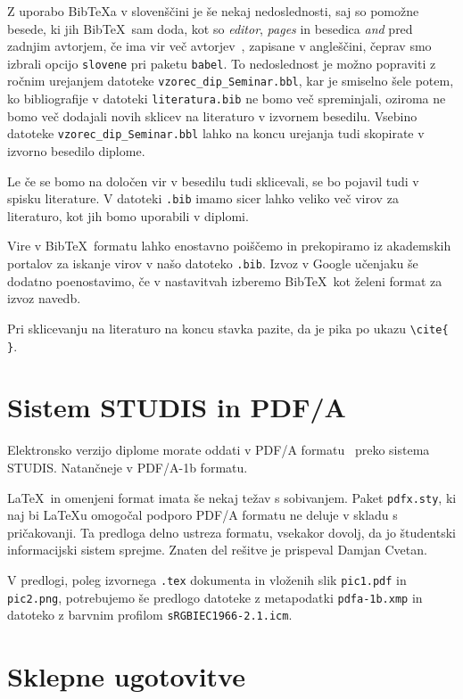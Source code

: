 \documentclass[a4paper, 12pt]{book}
\newcommand{\BibTeX}{{\sc Bib}\TeX}
\begin{document}
Z uporabo \BibTeX{a} v slovenščini je še nekaj nedoslednosti, saj so pomožne besede, ki jih \BibTeX\ sam doda,  kot so \textit{editor},  \textit{pages} in besedica  \textit{and} pred zadnjim avtorjem, 
če ima vir več avtorjev~\cite{andersen2012kinect}, zapisane v angleščini,
čeprav smo izbrali opcijo \texttt{slovene} pri paketu \texttt{babel}.
To nedoslednost je možno popraviti z ročnim urejanjem datoteke {\tt vzorec\_dip\_Seminar.bbl}, kar je smiselno šele potem, ko bibliografije v datoteki \texttt{literatura.bib} ne bomo več spreminjali, oziroma ne bomo več dodajali novih sklicev na literaturo
v izvornem besedilu.
Vsebino datoteke {\tt vzorec\_dip\_Seminar.bbl} lahko na koncu urejanja tudi skopirate v izvorno besedilo diplome.

Le če se bomo na določen vir v besedilu tudi sklicevali, se bo pojavil tudi v spisku literature.
V datoteki \texttt{.bib} imamo sicer lahko veliko več virov za literaturo, kot jih bomo uporabili v diplomi.

Vire v \BibTeX\ formatu lahko enostavno poiščemo in prekopiramo iz akademskih portalov za iskanje virov v našo datoteko \texttt{.bib}.
Izvoz v Google učenjaku še dodatno poenostavimo, če v nastavitvah izberemo \BibTeX\ kot želeni format za izvoz navedb.

Pri sklicevanju na literaturo na koncu stavka pazite, da je pika po ukazu \verb=\cite{ }=.
\chapter{Sistem STUDIS in PDF/A}
\label{PDF}

Elektronsko verzijo diplome morate oddati v PDF/A formatu~\cite{pdfa} preko sistema STUDIS.
Natančneje v PDF/A-1b formatu. 

\LaTeX\ in omenjeni format imata še nekaj težav s sobivanjem. 
Paket \texttt{pdfx.sty}, ki naj bi \LaTeX{u} omogočal podporo PDF/A formatu ne deluje v skladu s pričakovanji. 
Ta predloga delno ustreza formatu, vsekakor dovolj, da jo študentski informacijski sistem sprejme. 
Znaten del rešitve je prispeval Damjan Cvetan.

V predlogi, poleg izvornega \texttt{.tex} dokumenta in vloženih slik \texttt{pic1.pdf} in \texttt{pic2.png}, potrebujemo še predlogo datoteke z metapodatki \texttt{pdfa-1b.xmp} in datoteko z barvnim profilom \texttt{sRGBIEC1966-2.1.icm}.




\chapter{Sklepne ugotovitve}
\end{document}
